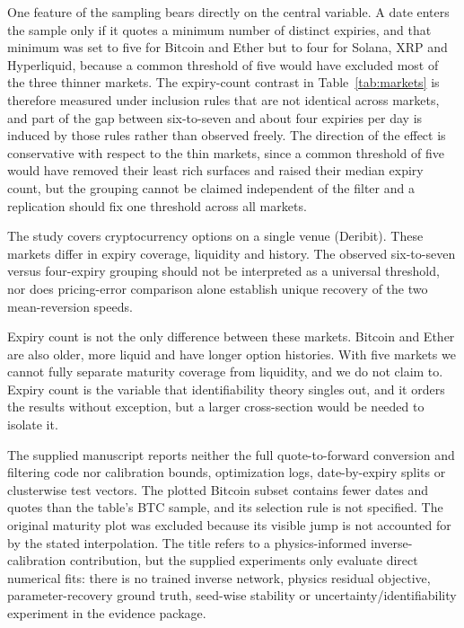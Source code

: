\documentclass[runningheads]{llncs}
\begin{document}
One feature of the sampling bears directly on the central variable. A date
enters the sample only if it quotes a minimum number of distinct expiries, and
that minimum was set to five for Bitcoin and Ether but to four for Solana, XRP
and Hyperliquid, because a common threshold of five would have excluded most
of the three thinner markets. The expiry-count contrast in
Table~\ref{tab:markets} is therefore measured under inclusion rules that are
not identical across markets, and part of the gap between six-to-seven and
about four expiries per day is induced by those rules rather than observed
freely. The direction of the effect is conservative with respect to the thin
markets, since a common threshold of five would have removed their least rich
surfaces and raised their median expiry count, but the grouping cannot be
claimed independent of the filter and a replication should fix one threshold
across all markets.

The study covers cryptocurrency options on a single venue (Deribit).
These markets differ in expiry coverage, liquidity and history. The
observed six-to-seven versus four-expiry grouping should not be
interpreted as a universal threshold, nor does pricing-error comparison
alone establish unique recovery of the two mean-reversion speeds.

Expiry count is not the only difference between these markets. Bitcoin
and Ether are also older, more liquid and have longer option histories.
With five markets we cannot fully separate maturity coverage from
liquidity, and we do not claim to. Expiry count is the variable that
identifiability theory singles out, and it orders the results without
exception, but a larger cross-section would be needed to isolate it.

The supplied manuscript reports neither the full quote-to-forward
conversion and filtering code nor calibration bounds, optimization logs,
date-by-expiry splits or clusterwise test vectors. The plotted Bitcoin
subset contains fewer dates and quotes than the table's BTC sample, and
its selection rule is not specified. The original maturity plot was
excluded because its visible jump is not accounted for by the stated
interpolation. The title refers to a physics-informed inverse-calibration
contribution, but the supplied experiments only evaluate direct
numerical fits: there is no trained inverse network, physics residual
objective, parameter-recovery ground truth, seed-wise stability or
uncertainty/identifiability experiment in the evidence package.
\end{document}
